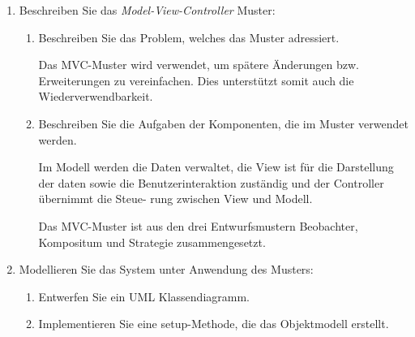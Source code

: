 \documentclass{bschlangaul-aufgabe}
\begin{document}
\begin{enumerate}


\item Beschreiben Sie das \emph{Model-View-Controller} Muster:

\begin{enumerate}


\item Beschreiben Sie das Problem, welches das Muster adressiert.

\begin{liAntwort}
Das MVC-Muster wird verwendet, um spätere Änderungen bzw. Erweiterungen
zu vereinfachen. Dies unterstützt somit auch die Wiederverwendbarkeit.
\end{liAntwort}


\item Beschreiben Sie die Aufgaben der Komponenten, die im Muster
verwendet werden.

\begin{liAntwort}
Im Modell werden die Daten verwaltet, die View ist für die Darstellung
der daten sowie die Benutzerinteraktion zuständig und der Controller
übernimmt die Steue- rung zwischen View und Modell.

Das MVC-Muster ist aus den drei Entwurfsmustern Beobachter, Kompositum
und Strategie zusammengesetzt.
\end{liAntwort}

\end{enumerate}


\item Modellieren Sie das System unter Anwendung des Musters:

\begin{enumerate}


\item Entwerfen Sie ein UML Klassendiagramm.


\item Implementieren Sie eine setup-Methode, die das Objektmodell
erstellt.
\end{enumerate}

\end{enumerate}
\end{document}
